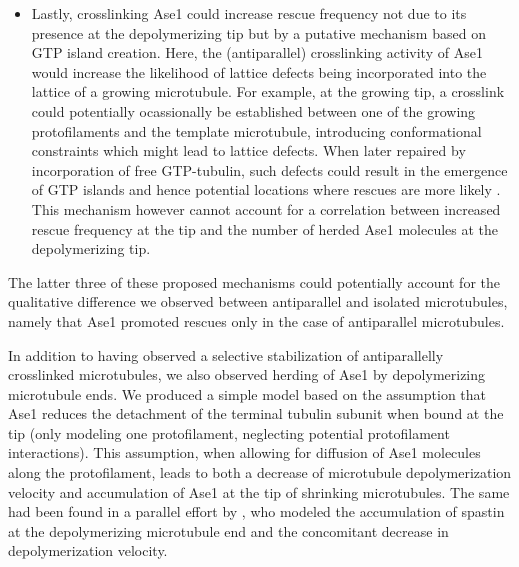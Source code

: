 \begin{itemize}
    \item Lastly, crosslinking Ase1 could increase rescue frequency not due to its presence at the depolymerizing tip but by a putative mechanism based on GTP island creation. Here, the (antiparallel) crosslinking activity of Ase1 would increase the likelihood of lattice defects being incorporated into the lattice of a growing microtubule. For example, at the growing tip, a crosslink could potentially ocassionally be established between one of the growing protofilaments and the template microtubule, introducing conformational constraints which might lead to lattice defects. When later repaired by incorporation of free GTP-tubulin, such defects could result in the emergence of GTP islands and hence potential locations where rescues are more likely . This mechanism however cannot account for a correlation between increased rescue frequency at the tip and the number of herded Ase1 molecules at the depolymerizing tip.
\end{itemize}
The latter three of these proposed mechanisms could potentially account for the qualitative difference we observed between antiparallel and isolated microtubules, namely that Ase1 promoted rescues only in the case of antiparallel microtubules.\par

In addition to having observed a selective stabilization of antiparallelly crosslinked microtubules, we also observed herding of Ase1 by depolymerizing microtubule ends. We produced a simple model based on the assumption that Ase1 reduces the detachment of the terminal tubulin subunit when bound at the tip (only modeling one protofilament, neglecting potential protofilament interactions). This assumption, when allowing for diffusion of Ase1 molecules along the protofilament, leads to both a decrease of microtubule depolymerization velocity and accumulation of Ase1 at the tip of shrinking microtubules. The same had been found in a parallel effort by \cite{Hiyasat}, who modeled the accumulation of spastin at the depolymerizing microtubule end and the concomitant decrease in depolymerization velocity.\par

